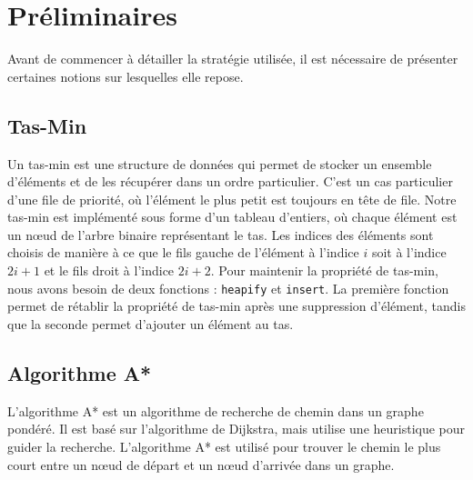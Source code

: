 \chapter{Préliminaires}
\label{cp:preliminaires}

Avant de commencer à détailler la stratégie utilisée, il est nécessaire de présenter certaines notions sur lesquelles elle repose.

\section{Tas-Min}

Un tas-min est une structure de données qui permet de stocker un ensemble d'éléments et de les récupérer dans un ordre particulier. C'est un cas particulier d'une file de priorité, où l'élément le plus petit est toujours en tête de file.
\newline
Notre tas-min est implémenté sous forme d'un tableau d'entiers, où chaque élément est un nœud de l'arbre binaire représentant le tas. Les indices des éléments sont choisis de manière à ce que le fils gauche de l'élément à l'indice $i$ soit à l'indice $2i+1$ et le fils droit à l'indice $2i+2$.
\newline
Pour maintenir la propriété de tas-min, nous avons besoin de deux fonctions : \texttt{heapify} et \texttt{insert}. La première fonction permet de rétablir la propriété de tas-min après une suppression d'élément, tandis que la seconde permet d'ajouter un élément au tas.


\section{Algorithme A*}

L'algorithme A* est un algorithme de recherche de chemin dans un graphe pondéré. Il est basé sur l'algorithme de Dijkstra, mais utilise une heuristique pour guider la recherche. L'algorithme A* est utilisé pour trouver le chemin le plus court entre un nœud de départ et un nœud d'arrivée dans un graphe.